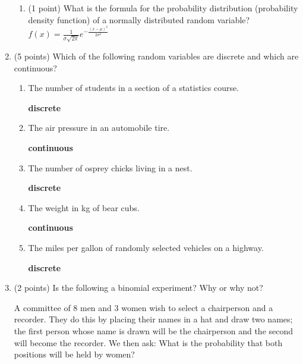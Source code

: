 \documentclass{article}
\begin{document}
\begin{enumerate}
\begin{enumerate}
	\item (1 point) What is the formula for the probability distribution (probability density function) of a normally distributed random variable? \\
	
	$f\left(x\right) = \frac{1}{\sigma \sqrt{2\pi}} e^{-\frac{\left(x - \mu\right)^{2}}{2 \sigma^{2}}}$\\


	
	\end{enumerate}
	
	
\item (5 points) Which of the following random variables are discrete and which are
continuous?

	\begin{enumerate}
	
	\item The number of students in a section of a statistics course.
	
	\textbf{discrete} \\
	\item The air pressure in an automobile tire.
	
	\textbf{continuous} \\
	\item The number of osprey chicks living in a nest.
	
	\textbf{discrete} \\
	\item The weight in kg of bear cubs.
	
	\textbf{continuous} \\
	\item The miles per gallon of randomly selected vehicles on a highway. 
	
	\textbf{discrete} \\
	
	\end{enumerate}
	

	
	
	

	
\item (2 points) Is the following a binomial experiment? Why or why not?

A committee of 8 men and 3 women wish to select a chairperson and a recorder. They do this by placing their names in a hat and draw two names; the first person whose name is drawn will be the chairperson and the second will become the recorder. We then ask: What is the probability that both positions will be held by women?
		

\end{enumerate}
\end{document}
